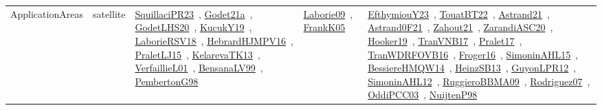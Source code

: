 {\begin{longtable}{lp{3cm}>{\raggedright\arraybackslash}p{6cm}>{\raggedright\arraybackslash}p{6cm}>{\raggedright\arraybackslash}p{8cm}}
ApplicationAreas & satellite & \href{../works/SquillaciPR23.pdf}{SquillaciPR23}~\cite{SquillaciPR23}, \href{../works/Godet21a.pdf}{Godet21a}~\cite{Godet21a}, \href{../works/GodetLHS20.pdf}{GodetLHS20}~\cite{GodetLHS20}, \href{../works/KucukY19.pdf}{KucukY19}~\cite{KucukY19}, \href{../works/LaborieRSV18.pdf}{LaborieRSV18}~\cite{LaborieRSV18}, \href{../works/HebrardHJMPV16.pdf}{HebrardHJMPV16}~\cite{HebrardHJMPV16}, \href{../works/PraletLJ15.pdf}{PraletLJ15}~\cite{PraletLJ15}, \href{../works/KelarevaTK13.pdf}{KelarevaTK13}~\cite{KelarevaTK13}, \href{../works/VerfaillieL01.pdf}{VerfaillieL01}~\cite{VerfaillieL01}, \href{../works/BensanaLV99.pdf}{BensanaLV99}~\cite{BensanaLV99}, \href{../works/PembertonG98.pdf}{PembertonG98}~\cite{PembertonG98} & \href{../works/Laborie09.pdf}{Laborie09}~\cite{Laborie09}, \href{../works/FrankK05.pdf}{FrankK05}~\cite{FrankK05} & \href{../works/EfthymiouY23.pdf}{EfthymiouY23}~\cite{EfthymiouY23}, \href{../works/TouatBT22.pdf}{TouatBT22}~\cite{TouatBT22}, \href{../works/Astrand21.pdf}{Astrand21}~\cite{Astrand21}, \href{../works/Astrand0F21.pdf}{Astrand0F21}~\cite{Astrand0F21}, \href{../works/Zahout21.pdf}{Zahout21}~\cite{Zahout21}, \href{../works/ZarandiASC20.pdf}{ZarandiASC20}~\cite{ZarandiASC20}, \href{../works/Hooker19.pdf}{Hooker19}~\cite{Hooker19}, \href{../works/TranVNB17.pdf}{TranVNB17}~\cite{TranVNB17}, \href{../works/Pralet17.pdf}{Pralet17}~\cite{Pralet17}, \href{../works/TranWDRFOVB16.pdf}{TranWDRFOVB16}~\cite{TranWDRFOVB16}, \href{../works/Froger16.pdf}{Froger16}~\cite{Froger16}, \href{../works/SimoninAHL15.pdf}{SimoninAHL15}~\cite{SimoninAHL15}, \href{../works/BessiereHMQW14.pdf}{BessiereHMQW14}~\cite{BessiereHMQW14}, \href{../works/HeinzSB13.pdf}{HeinzSB13}~\cite{HeinzSB13}, \href{../works/GuyonLPR12.pdf}{GuyonLPR12}~\cite{GuyonLPR12}, \href{../works/SimoninAHL12.pdf}{SimoninAHL12}~\cite{SimoninAHL12}, \href{../works/RuggieroBBMA09.pdf}{RuggieroBBMA09}~\cite{RuggieroBBMA09}, \href{../works/Rodriguez07.pdf}{Rodriguez07}~\cite{Rodriguez07}, \href{../works/OddiPCC03.pdf}{OddiPCC03}~\cite{OddiPCC03}, \href{../works/NuijtenP98.pdf}{NuijtenP98}~\cite{NuijtenP98}\\

\end{longtable}}
